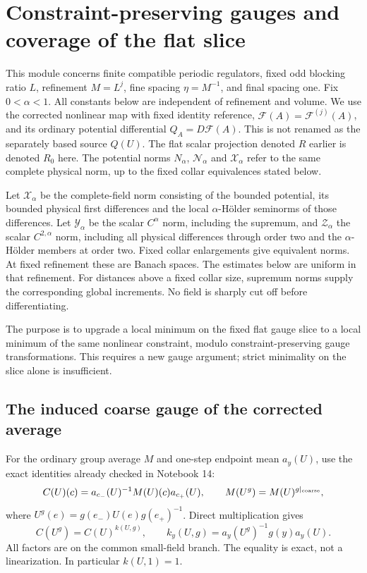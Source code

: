 \section{Constraint-preserving gauges and coverage of the flat slice}
\label{ng-section}

This module concerns finite compatible periodic regulators, fixed
odd blocking ratio $L$, refinement $M=L^j$, fine spacing $\eta=M^{-1}$,
and final spacing one. Fix $0<\alpha<1$. All constants below are
independent of refinement and volume. We use the corrected nonlinear
map with fixed identity reference, $\mathcal F(A)=\mathcal F^{(j)}(A)$,
and its ordinary potential differential $Q_A=D\mathcal F(A)$.
This is not renamed as the separately based source $Q(U)$.
The flat scalar projection denoted $R$ earlier is denoted $R_0$
here. The potential norms $N_\alpha$, $\mathcal N_\alpha$ and
$\mathcal X_\alpha$ refer to the same complete physical norm,
up to the fixed collar equivalences stated below.

Let $\mathcal X_\alpha$ be the complete-field norm consisting of
the bounded potential, its bounded physical first differences and
the local $\alpha$-H\"older seminorms of those differences. Let
$\mathcal Y_\alpha$ be the scalar $C^\alpha$ norm, including the
supremum, and $\mathcal Z_\alpha$ the scalar $C^{2,\alpha}$ norm,
including all physical differences through order two and the
$\alpha$-H\"older members at order two. Fixed collar enlargements
give equivalent norms. At fixed refinement these are Banach spaces.
The estimates below are uniform in that refinement. For distances
above a fixed collar size, supremum norms supply the corresponding
global increments. No field is sharply cut off before differentiating.

The purpose is to upgrade a local minimum on the fixed flat gauge
slice to a local minimum of the same nonlinear constraint, modulo
constraint-preserving gauge transformations. This requires a new
gauge argument; strict minimality on the slice alone is insufficient.

\subsection{The induced coarse gauge of the corrected average}

For the ordinary group average $M$ and one-step endpoint mean
$a_y(U)$, use the exact identities already checked in Notebook 14:
\[
 C(U)(c)=a_{c_-}(U)^{-1}M(U)(c)a_{c_+}(U),\qquad
 M(U^g)=M(U)^{g|_{\rm coarse}},
\]
where $U^g(e)=g(e_-)U(e)g(e_+)^{-1}$. Direct multiplication gives
\begin{equation}\label{ng-induced-group-gauge}
 C(U^g)=C(U)^{k(U,g)},\qquad
 k_y(U,g)=a_y(U^g)^{-1}g(y)a_y(U).
\end{equation}
All factors are on the common small-field branch. The equality is
exact, not a linearization. In particular $k(U,1)=1$.

